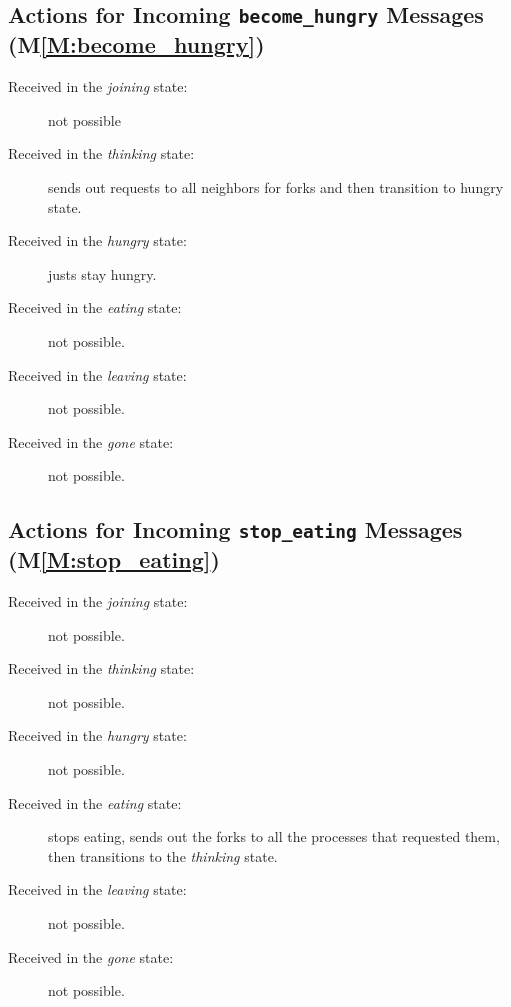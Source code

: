 \documentclass[11pt]{article}
\begin{document}
\subsection{Actions for Incoming \texttt{become\_hungry} Messages (M\ref{M:become_hungry})}
\begin{description}
\item[Received in the \textit{joining} state:] not possible
\item[Received in the \textit{thinking} state:] sends out requests to all neighbors for forks and then transition to hungry state.
\item[Received in the \textit{hungry} state:] justs stay hungry.
\item[Received in the \textit{eating} state:] not possible.
\item[Received in the \textit{leaving} state:] not possible.
\item[Received in the \textit{gone} state:] not possible.
\end{description}

\subsection{Actions for Incoming \texttt{stop\_eating} Messages (M\ref{M:stop_eating})}
\begin{description}
\item[Received in the \textit{joining} state:] not possible.
\item[Received in the \textit{thinking} state:] not possible.
\item[Received in the \textit{hungry} state:] not possible.
\item[Received in the \textit{eating} state:] stops eating, sends out the forks to all the processes that requested them, then transitions to the \emph{thinking} state.
\item[Received in the \textit{leaving} state:] not possible.
\item[Received in the \textit{gone} state:] not possible.
\end{description}
\end{document}
